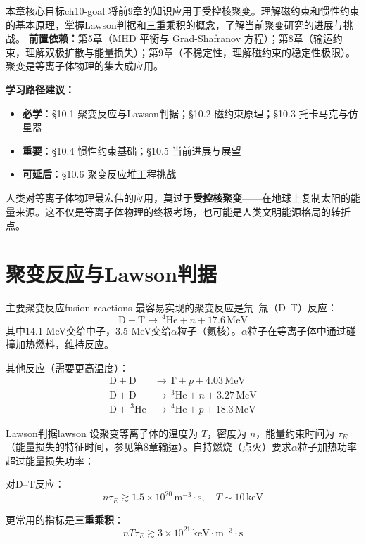 \documentclass[12pt,a4paper,openany,oneside]{book}
\newcommand{\difficulty}[1]{\marginnote{\hfill\textcolor{coverMid!80}{\rule[-0.1em]{2pt}{0.9em}}\,\textcolor{coverMid}{\footnotesize\textbf{[#1]}}}}
\begin{document}
\begin{insight}{本章核心目标}{ch10-goal}
将前9章的知识应用于受控核聚变。理解磁约束和惯性约束的基本原理，掌握Lawson判据和三重乘积的概念，了解当前聚变研究的进展与挑战。
\tcblower
\textbf{前置依赖：}第5章（MHD 平衡与 Grad-Shafranov 方程）；第8章（输运约束，理解双极扩散与能量损失）；第9章（不稳定性，理解磁约束的稳定性极限）。聚变是等离子体物理的集大成应用。

\textbf{学习路径建议：}

\begin{itemize}[leftmargin=*]
\item[\textcolor{red}{$\blacksquare$}] \textbf{必学}：\S10.1 聚变反应与Lawson判据；\S10.2 磁约束原理；\S10.3 托卡马克与仿星器
\item[\textcolor{orange}{$\blacksquare$}] \textbf{重要}：\S10.4 惯性约束基础；\S10.5 当前进展与展望
\item[\textcolor{green}{$\blacksquare$}] \textbf{可延后}：\S10.6 聚变反应堆工程挑战
\end{itemize}
\end{insight}

人类对等离子体物理最宏伟的应用，莫过于\textbf{受控核聚变}——在地球上复制太阳的能量来源。这不仅是等离子体物理的终极考场，也可能是人类文明能源格局的转折点。

\section{聚变反应与Lawson判据}\difficulty{基础}

\begin{definition}{主要聚变反应}{fusion-reactions}
最容易实现的聚变反应是氘--氚（D--T）反应：
\[
\mathrm{D} + \mathrm{T} \rightarrow \,^4\mathrm{He} + n + 17.6\,\mathrm{MeV}
\]
其中14.1 MeV交给中子，3.5 MeV交给$\alpha$粒子（氦核）。$\alpha$粒子在等离子体中通过碰撞加热燃料，维持反应。

其他反应（需要更高温度）：
\begin{align*}
\mathrm{D} + \mathrm{D} &\rightarrow \mathrm{T} + p + 4.03\,\mathrm{MeV} \\
\mathrm{D} + \mathrm{D} &\rightarrow \,^3\mathrm{He} + n + 3.27\,\mathrm{MeV} \\
\mathrm{D} + \,^3\mathrm{He} &\rightarrow \,^4\mathrm{He} + p + 18.3\,\mathrm{MeV}
\end{align*}
\end{definition}

\begin{theorem}{Lawson判据}{lawson}
设聚变等离子体的温度为 $T$，密度为 $n$，能量约束时间为 $\tau_E$（能量损失的特征时间，参见第8章输运）。自持燃烧（点火）要求$\alpha$粒子加热功率超过能量损失功率：

对D--T反应：
\[
n\tau_E \gtrsim 1.5\times 10^{20}\,\mathrm{m}^{-3}\cdot\mathrm{s}, \quad T \sim 10\,\mathrm{keV}
\]

更常用的指标是\textbf{三重乘积}：
\[
n T \tau_E \gtrsim 3\times 10^{21}\,\mathrm{keV}\cdot\mathrm{m}^{-3}\cdot\mathrm{s}
\]
\end{theorem}
\end{document}
